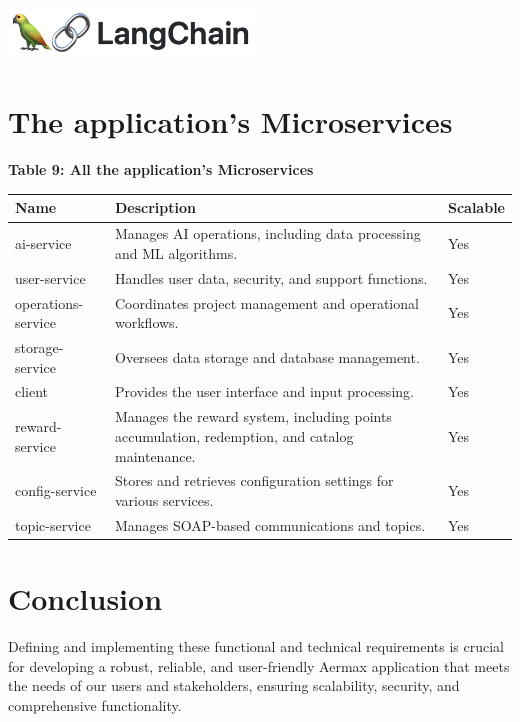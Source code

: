 \begin{itemize}
          \begin{minipage}{\linewidth}
              \centering
              \includegraphics[width=6.5cm]{src/assets/logos/langchain.png}
          \end{minipage}
\end{itemize}


\section{The application’s Microservices}

\textbf{Table 9: All the application’s Microservices}

\begin{longtable}{|p{3cm}|p{7cm}|p{2cm}|}
    \hline
    \textbf{Name} & \textbf{Description} & \textbf{Scalable} \\
    \hline
    \endhead
    ai-service & Manages AI operations, including data processing and ML algorithms. & Yes \\
    \hline
    user-service & Handles user data, security, and support functions. & Yes \\
    \hline
    operations-service & Coordinates project management and operational workflows. & Yes \\
    \hline
    storage-service & Oversees data storage and database management. & Yes \\
    \hline
    client & Provides the user interface and input processing. & Yes \\
    \hline
    reward-service & Manages the reward system, including points accumulation, redemption, and catalog maintenance. & Yes \\
    \hline
    config-service & Stores and retrieves configuration settings for various services. & Yes \\
    \hline
    topic-service & Manages SOAP-based communications and topics. & Yes \\
    \hline
    \end{longtable}
    


\setcounter{secnumdepth}{0} %
\section{Conclusion}
Defining and implementing these functional and technical requirements is crucial for developing a robust, reliable, and user-friendly Aermax application that meets the needs of our users and stakeholders, ensuring scalability, security, and comprehensive functionality.






